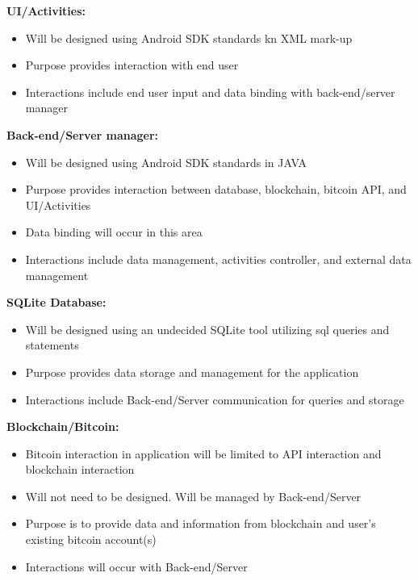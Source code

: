 \textbf{UI/Activities:}\\
\begin{itemize}
\item Will be designed using Android SDK standards kn XML mark-up 
\item Purpose provides interaction with end user
\item Interactions include end user input and data binding with back-end/server manager\\
\end{itemize}

\textbf{Back-end/Server manager:}\\
\begin{itemize}
\item Will be designed using Android SDK standards in JAVA
\item Purpose provides interaction between database, blockchain, bitcoin API, and UI/Activities
\item Data binding will occur in this area
\item Interactions include data management, activities controller, and external data management\\
\end{itemize}

\textbf{SQLite Database:}\\
\begin{itemize}
\item Will be designed using an undecided SQLite tool utilizing sql queries and statements 
\item Purpose provides data storage and management for the application
\item Interactions include Back-end/Server communication for queries and storage\\
\end{itemize}

\textbf{Blockchain/Bitcoin:}\\
\begin{itemize}
\item Bitcoin interaction in application will be limited to API interaction and blockchain interaction
\item Will not need to be designed. Will be managed by Back-end/Server
\item Purpose is to provide data and information from blockchain and user's existing bitcoin account(s)
\item Interactions will occur with Back-end/Server\\
\end{itemize}


